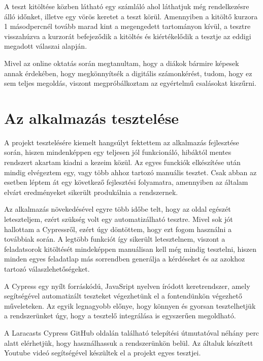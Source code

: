 \documentclass[
]{thesis-ekf}
\theoremstyle{definition}
\theoremstyle{remark}
\begin{document}
                    A teszt kitöltése közben látható egy számláló ahol láthatjuk még rendelkezésre álló időnket, illetve egy vörös keretet a teszt körül. Amennyiben a kitöltő kurzora 1 másodpercnél tovább marad kint a megengedett tartományon kívül, a tesztre visszahúzva a kurzorát befejeződik a kitöltés és kiértékelődik a tesztje az eddigi megadott válaszai alapján.
                    
                    Mivel az online oktatás során megtanultam, hogy a diákok bármire képesek annak érdekében, hogy megkönnyítsék a digitális számonkérést, tudom, hogy ez sem teljes megoldás, viszont megpróbálkoztam az egyértelmű csalásokat kiszűrni.
        \chapter{Az alkalmazás tesztelése}
            A projekt tesztelésére kiemelt hangsúlyt fektettem az alkalmazás fejlesztése során, hiszen mindenképpen egy teljesen jól funkcionáló, hibáktól mentes rendszert akartam kiadni a kezeim közül. Az egyes funckiók elkészítése után mindig elvégeztem egy, vagy több ahhoz tartozó manuális tesztet. Csak abban az esetben léptem át egy következő fejlesztési folyamatra, amennyiben az általam elvárt eredményeket sikerült produkálnia a rendszernek.

            Az alkalmazás növekedésével egyre több időbe telt, hogy az oldal egészét leteszteljem, ezért szükség volt egy automatizálható tesztre. Mivel sok jót hallottam a Cypressről, ezért úgy döntöttem, hogy ezt fogom használni a továbbiak során. A legtöbb funkciót így sikerült letesztelnem, viszont a feladatsorok kitöltését mindeképpen manuálisan kell még mindig tesztelni, hiszen minden egyes feladatlap más sorrendben generálja a kérdéseket és az azokhoz tartozó válaszlehetőségeket.

            A Cypress egy nyílt forráskódú, JavaSript nyelven íródott keretrendszer, amely segítségével automatizált teszteket végezhetünk el a fontendünkön végezhető műveleteken. Az egyik legnagyobb előnye, hogy könnyen és gyorsan tesztelhetjük a rendszerünket úgy, hogy a tesztelő integrálása is egyszerűen megoldható.

            A Laracasts Cypress GitHub\cite{LaracastsCypress} oldalán található telepítési útmutatóval néhány perc alatt elérhetjük, hogy használhassuk a rendszerünkön belül. Az általuk készített Youtube videó\cite{LaracastsCypressYoutube} segítségével készültek el a projekt egyes tesztjei.
\end{document}
